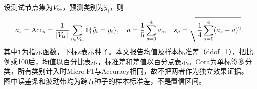 设测试节点集为$V_{\rm te}$，预测类别为$\widehat y_i$，则
\begin{equation}\label{eq:accuracy}
a_s=\operatorname{Acc}_s=\frac1{|V_{\rm te}|}\sum_{i\in V_{\rm te}}\mathbf1\{\widehat y_i=y_i\},\quad
\bar a=\frac15\sum_{s=0}^{4}a_s,\quad
s_a=\sqrt{\frac1{4}\sum_{s=0}^{4}(a_s-\bar a)^2}.
\end{equation}
其中$\mathbf1$为指示函数，下标$s$表示种子。本文报告均值及样本标准差（ddof=1），把比例乘100后，均值以百分比表示，标准差和差值以百分点表示。Cora为单标签多分类，所有类别计入时Micro-F1与Accuracy相同，故不把两者作为独立效果证据。图中误差条和波动带均为跨五种子的样本标准差，不是置信区间。

